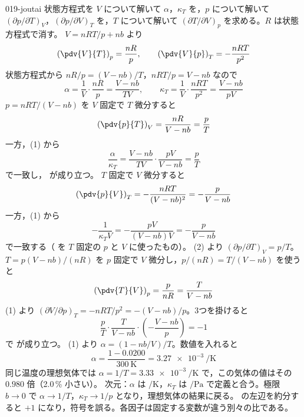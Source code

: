 \documentclass[uplatex,dvipdfmx,a4paper,11pt]{jsarticle}
\begin{document}
\begin{kaisetsu}{019-joutai}
\houshin 状態方程式を $V$ について解いて $\alpha$，$\kappa_{T}$ を，$p$ について解いて $(\partial p/\partial T)_{V}$，$(\partial p/\partial V)_{T}$ を，$T$ について解いて $(\partial T/\partial V)_{p}$ を求める。$R$ は状態方程式で消す。
\keisan {} $V = nRT/p + nb$ より
\[ \left(\pdv{V}{T}\right)_{p} = \frac{nR}{p}, \qquad \left(\pdv{V}{p}\right)_{T} = -\frac{nRT}{p^{2}} \]
状態方程式から $nR/p = (V - nb)/T$，$nRT/p = V - nb$ なので
\[ \alpha = \frac{1}{V}\cdot\frac{nR}{p} = \frac{V - nb}{TV}, \qquad \kappa_{T} = \frac{1}{V}\cdot\frac{nRT}{p^{2}} = \frac{V - nb}{pV} \]
 $p = nRT/(V - nb)$ を $V$ 固定で $T$ 微分すると
\[ \left(\pdv{p}{T}\right)_{V} = \frac{nR}{V - nb} = \frac{p}{T} \]
一方，(1) から
\[ \frac{\alpha}{\kappa_{T}} = \frac{V - nb}{TV}\cdot\frac{pV}{V - nb} = \frac{p}{T} \]
で一致し， が成り立つ。
 $T$ 固定で $V$ 微分すると
\[ \left(\pdv{p}{V}\right)_{T} = -\frac{nRT}{(V - nb)^{2}} = -\frac{p}{V - nb} \]
一方，(1) から
\[ -\frac{1}{\kappa_{T}V} = -\frac{pV}{(V - nb)V} = -\frac{p}{V - nb} \]
で一致する（ を $T$ 固定の $p$ と $V$ に使ったもの）。
 (2) より $(\partial p/\partial T)_{V} = p/T$。$T = p(V - nb)/(nR)$ を $p$ 固定で $V$ 微分し，$p/(nR) = T/(V - nb)$ を使うと
\[ \left(\pdv{T}{V}\right)_{p} = \frac{p}{nR} = \frac{T}{V - nb} \]
(1) より $(\partial V/\partial p)_{T} = -nRT/p^{2} = -(V - nb)/p$。3つを掛けると
\[ \frac{p}{T}\cdot\frac{T}{V - nb}\cdot\left(-\frac{V - nb}{p}\right) = -1 \]
で  が成り立つ。
 (1) より $\alpha = (1 - nb/V)/T$。数値を入れると
\[ \alpha = \frac{1 - 0.0200}{\qty{300}{\kelvin}} = \qty{3.27e-3}{\per\kelvin} \]
同じ温度の理想気体では $\alpha = 1/T = \qty{3.33e-3}{\per\kelvin}$ で，この気体の値はその $0.980$ 倍（2.0\,\% 小さい）。
\kenzan 次元：$\alpha$ は $\unit{\per\kelvin}$，$\kappa_{T}$ は $\unit{\per\pascal}$ で定義と合う。極限 $b \to 0$ で $\alpha \to 1/T$，$\kappa_{T} \to 1/p$ となり，理想気体の結果に戻る。
\tsumazuki {} の左辺を約分すると $+1$ になり，符号を誤る。各因子は固定する変数が違う別々の比である。
\end{kaisetsu}
\end{document}
